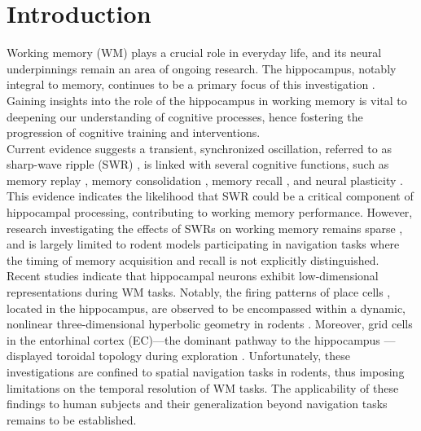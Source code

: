 \section{Introduction}
Working memory (WM) plays a crucial role in everyday life, and its neural underpinnings remain an area of ongoing research. The hippocampus, notably integral to memory, continues to be a primary focus of this investigation \cite{scoville_loss_1957} \cite{squire_legacy_2009}  \cite{boran_persistent_2019} \cite{kaminski_persistently_2017} \cite{kornblith_persistent_2017} \cite{faraut_dataset_2018} \cite{borders_hippocampus_2022} \cite{li_functional_2023} \cite{dimakopoulos_information_2022}. Gaining insights into the role of the hippocampus in working memory is vital to deepening our understanding of cognitive processes, hence fostering the progression of cognitive training and interventions.
\\
\indent
Current evidence suggests a transient, synchronized oscillation, referred to as sharp-wave ripple (SWR) \cite{buzsaki_hippocampal_2015}, is linked with several cognitive functions, such as memory replay \cite{wilson_reactivation_1994} \cite{nadasdy_replay_1999} \cite{lee_memory_2002} \cite{diba_forward_2007} \cite{davidson_hippocampal_2009}, memory consolidation \cite{girardeau_selective_2009} \cite{ego-stengel_disruption_2010} \cite{fernandez-ruiz_long-duration_2019} \cite{kim_corticalhippocampal_2022}, memory recall \cite{wu_hippocampal_2017} \cite{norman_hippocampal_2019} \cite{norman_hippocampal_2021}, and neural plasticity \cite{behrens_induction_2005} \cite{norimoto_hippocampal_2018}. This evidence indicates the likelihood that SWR could be a critical component of hippocampal processing, contributing to working memory performance. However, research investigating the effects of SWRs on working memory remains sparse \cite{jadhav_awake_2012}, and is largely limited to rodent models participating in navigation tasks where the timing of memory acquisition and recall is not explicitly distinguished.
\\
\indent
Recent studies indicate that hippocampal neurons exhibit low-dimensional representations during WM tasks. Notably, the firing patterns of place cells \cite{okeefe_hippocampus_1971} \cite{okeefe_place_1976} \cite{ekstrom_cellular_2003} \cite{kjelstrup_finite_2008} \cite{harvey_intracellular_2009}, located in the hippocampus, are observed to be encompassed within a dynamic, nonlinear three-dimensional hyperbolic geometry in rodents \cite{zhang_hippocampal_2022}. Moreover, grid cells in the entorhinal cortex (EC)—the dominant pathway to the hippocampus \cite{naber_reciprocal_2001} \cite{van_strien_anatomy_2009} \cite{strange_functional_2014}—displayed toroidal topology during exploration \cite{gardner_toroidal_2022}. Unfortunately, these investigations are confined to spatial navigation tasks in rodents, thus imposing limitations on the temporal resolution of WM tasks. The applicability of these findings to human subjects and their generalization beyond navigation tasks remains to be established.
